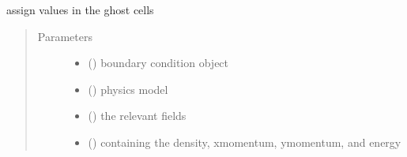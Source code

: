 \documentclass[letterpaper,10pt,english]{sphinxmanual}
\begin{document}
\begin{fulllineitems}
\label{\detokenize{autoapi/halo/index:halo.halo}}
\sphinxAtStartPar
assign values in the ghost cells
\begin{quote}\begin{description}
\item[{Parameters}] \leavevmode\begin{itemize}
\item {} 
\sphinxAtStartPar
{} () \textendash{} boundary condition object

\item {} 
\sphinxAtStartPar
{} ({\hyperref[\detokenize{autoapi/NavierStokes/index:NavierStokes.NavierStokes}]{}}) \textendash{} physics model

\item {} 
\sphinxAtStartPar
{} ({\hyperref[\detokenize{autoapi/Workspace/index:Workspace.Workspace}]{}}) \textendash{} the relevant fields

\item {} 
\sphinxAtStartPar
{} ({\hyperref[\detokenize{autoapi/Field/index:Field.Field}]{}}) \textendash{} containing the density, x\sphinxhyphen{}momentum, y\sphinxhyphen{}momentum, and energy

\end{itemize}

\end{description}\end{quote}

\end{fulllineitems}



\section{}
\label{\detokenize{autoapi/stability_fast/index:module-stability_fast}}\label{\detokenize{autoapi/stability_fast/index:stability-fast}}\label{\detokenize{autoapi/stability_fast/index::doc}}
\end{document}
